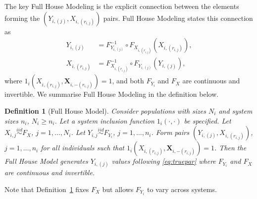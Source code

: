 \documentclass[12pt]{article}
\DeclareMathOperator*{\Prob}{P}
\newtheorem{defn}[theorem]{Definition}
\begin{document}
The key Full House Modeling is the explicit connection between the elements forming the $(Y_{i,(j)}, X_{i,(r_{i,j})})$ pairs. Full House Modeling states this connection as
\begin{equation} \label{eq:truepar}
\begin{split}
  Y_{i, (j)} &= F_{Y_{i, (j)}}^{-1} \circ F_{X_{i, (r_{i,j})}} \left(X_{i, (r_{i,j})}\right), \\
  X_{i, (r_{i,j})} &= F_{X_{i, (r_{i,j})}}^{-1} \circ F_{Y_{i,(j)}} \left(Y_{i,(j)} \right),
\end{split}
\end{equation}
where $1_i(X_{i, (r_{i,j})}, \textbf{X}_{i, -(r_{i,j})}) = 1$, and both $F_{Y_i}$ and $F_X$ are continuous and invertible. We summarise Full House Modeling in the definition below.


\begin{defn} [Full House Model]
\label{def:fhm}
	Consider populations with sizes $N_i$ and system sizes $n_i$, $N_i \geq n_i$. Let a system inclusion function $1_i(\cdot,\cdot)$ be specified. Let $X_{i,j} \overset{iid}{\sim} F_X$, $j = 1,\ldots,N_i$. Let $Y_{i,j} \overset{iid}{\sim} F_{Y_i}$, $j = 1,\ldots, n_i$. Form pairs $(Y_{i,(j)}, X_{i,(r_{i,j})})$, $j = 1,\ldots,n_i$ for all individuals such that $1_i(X_{i, (r_{i,j})}, \textbf{X}_{i, -(r_{i,j})}) = 1$. Then the Full House Model generates $Y_{i,(j)}$ values following \eqref{eq:truepar} where $F_{Y_i}$ and $F_X$ are continuous and invertible.
\end{defn}

Note that Definition~\ref{def:fhm} fixes $F_X$ but allows $F_{Y_i}$ to vary across systems. 

\end{document}
